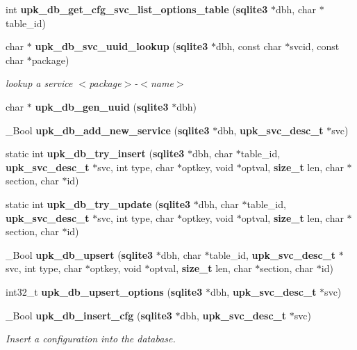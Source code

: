 \begin{DoxyCompactItemize}
int {\bf upk\_\-db\_\-get\_\-cfg\_\-svc\_\-list\_\-options\_\-table} ({\bf sqlite3} $\ast$dbh, char $\ast$table\_\-id)
\item 
char $\ast$ {\bf upk\_\-db\_\-svc\_\-uuid\_\-lookup} ({\bf sqlite3} $\ast$dbh, const char $\ast$svcid, const char $\ast$package)
\begin{DoxyCompactList}\small\item\em lookup a service $<$package$>$-\/$<$name$>$ \end{DoxyCompactList}\item 
char $\ast$ {\bf upk\_\-db\_\-gen\_\-uuid} ({\bf sqlite3} $\ast$dbh)
\item 
\_\-Bool {\bf upk\_\-db\_\-add\_\-new\_\-service} ({\bf sqlite3} $\ast$dbh, {\bf upk\_\-svc\_\-desc\_\-t} $\ast$svc)
\item 
static int {\bf upk\_\-db\_\-try\_\-insert} ({\bf sqlite3} $\ast$dbh, char $\ast$table\_\-id, {\bf upk\_\-svc\_\-desc\_\-t} $\ast$svc, int type, char $\ast$optkey, void $\ast$optval, {\bf size\_\-t} len, char $\ast$section, char $\ast$id)
\item 
static int {\bf upk\_\-db\_\-try\_\-update} ({\bf sqlite3} $\ast$dbh, char $\ast$table\_\-id, {\bf upk\_\-svc\_\-desc\_\-t} $\ast$svc, int type, char $\ast$optkey, void $\ast$optval, {\bf size\_\-t} len, char $\ast$section, char $\ast$id)
\item 
\_\-Bool {\bf upk\_\-db\_\-upsert} ({\bf sqlite3} $\ast$dbh, char $\ast$table\_\-id, {\bf upk\_\-svc\_\-desc\_\-t} $\ast$svc, int type, char $\ast$optkey, void $\ast$optval, {\bf size\_\-t} len, char $\ast$section, char $\ast$id)
\item 
int32\_\-t {\bf upk\_\-db\_\-upsert\_\-options} ({\bf sqlite3} $\ast$dbh, {\bf upk\_\-svc\_\-desc\_\-t} $\ast$svc)
\item 
\_\-Bool {\bf upk\_\-db\_\-insert\_\-cfg} ({\bf sqlite3} $\ast$dbh, {\bf upk\_\-svc\_\-desc\_\-t} $\ast$svc)
\begin{DoxyCompactList}\small\item\em Insert a configuration into the database. \end{DoxyCompactList}\end{DoxyCompactItemize}
